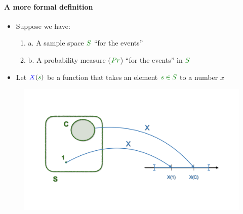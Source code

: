 \documentclass[smaller, handout]{beamer}\usepackage[]{graphicx}\usepackage[]{color}
\newenvironment{stepenumerate}{\begin{enumerate}[<+->]}{\end{enumerate}}
\newenvironment{stepitemize}{\begin{itemize}[<+->]}{\end{itemize} }
\begin{document}
\begin{frame}{\secname}
\framesubtitle{A more formal definition}
  \begin{stepitemize}
  \item Suppose we have:

  \begin{stepenumerate}[a.]
  \item[a.] A sample space $\color{Mygreen} S \color{black}$ ``for the events''
  \item[b.] A probability measure ($\color{Mygreen} Pr \color{black}$) ``for the events'' in $\color{Mygreen} S \color{black}$
  \end{stepenumerate}

  \item Let $\color{blue} X \color{black}(\color{Mygreen} s \color{black})$ be a function that takes an element $\color{Mygreen}  s\in S\color{black}$ to a number $x$

  \end{stepitemize}

  \begin{minipage}{1.0\textwidth}
  \begin{figure}[h!]
  \centering
  \includegraphics[scale=0.15]{img/charts.010.png}
  \end{figure}
  \end{minipage}
\end{frame}
\end{document}
